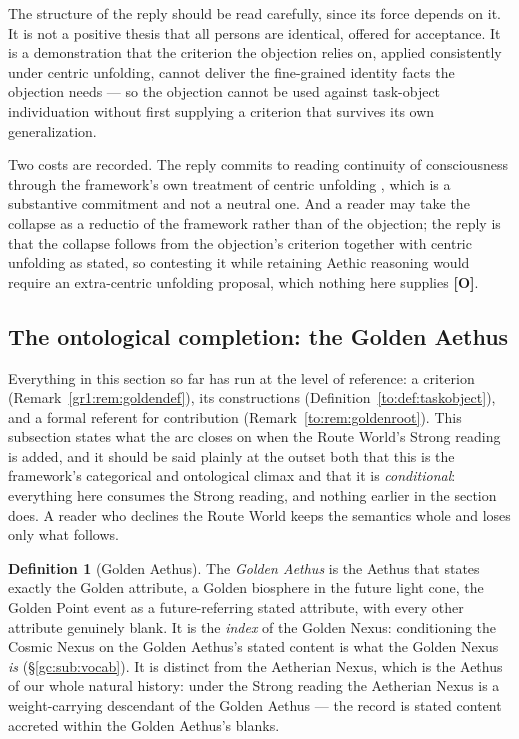 \documentclass[11pt]{article}
\numberwithin{equation}{section}
\theoremstyle{plain}
\theoremstyle{definition}
\newtheorem{definition}[theorem]{Definition}
\theoremstyle{remark}
\begin{document}
The structure of the reply should be read carefully, since its force
depends on it. It is not a positive thesis that all persons are
identical, offered for acceptance. It is a demonstration that the
criterion the objection relies on, applied consistently under centric
unfolding, cannot deliver the fine-grained identity facts the objection
needs --- so the objection cannot be used against task-object
individuation without first supplying a criterion that survives its own
generalization.

Two costs are recorded. The reply commits to reading continuity of
consciousness through the framework's own treatment of centric unfolding
\cite{Aethus}, which is a substantive commitment and not a neutral one.
And a reader may take the collapse as a reductio of the framework rather
than of the objection; the reply is that the collapse
follows from the objection's criterion together with centric unfolding
as stated, so contesting it while retaining Aethic reasoning would
require an extra-centric unfolding proposal, which nothing here
supplies \textbf{[O]}.

\subsection{The ontological completion: the Golden Aethus}
\label{to:sub:goldenaethus}

Everything in this section so far has run at the level of reference:
a criterion (Remark~\ref{gr1:rem:goldendef}), its constructions
(Definition~\ref{to:def:taskobject}), and a formal referent for
contribution (Remark~\ref{to:rem:goldenroot}). This subsection states
what the arc closes on when the Route World's Strong reading is added,
and it should be said plainly at the outset both that this is the
framework's categorical and ontological climax and that it is
\emph{conditional}: everything here consumes the Strong reading, and
nothing earlier in the section does. A reader who declines the Route
World keeps the semantics whole and loses only what follows.

\begin{definition}[Golden Aethus]\label{to:def:goldenaethus}
The \emph{Golden Aethus} is the Aethus that states exactly the Golden
attribute, a Golden biosphere in the future light cone, the Golden
Point event as a future-referring stated attribute, with every
other attribute genuinely blank. It is the \emph{index} of the Golden
Nexus: conditioning the Cosmic Nexus on the Golden Aethus's stated
content is what the Golden Nexus \emph{is} (\S\ref{gc:sub:vocab}).
It is distinct from the Aetherian Nexus, which is the Aethus of our
whole natural history: under the Strong reading the Aetherian Nexus is
a weight-carrying descendant of the Golden Aethus --- the record is
stated content accreted within the Golden Aethus's blanks.
\end{definition}
\end{document}
